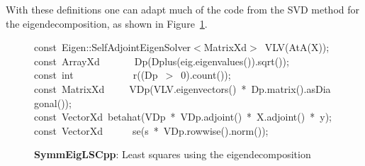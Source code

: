 \documentclass[shortnames,article]{jss}
\newcommand{\hlstd}[1]{\textcolor[rgb]{0,0,0}{#1}}
\newcommand{\hlnum}[1]{\textcolor[rgb]{0,0,0}{#1}}
\newcommand{\hlopt}[1]{\textcolor[rgb]{0,0,0}{#1}}
\newcommand{\hlkwb}[1]{\textcolor[rgb]{0.13,0.54,0.13}{#1}}
\newcommand{\hlkwd}[1]{\textcolor[rgb]{0,0,0}{#1}}
\begin{document}
With these definitions one can adapt much of the code from the SVD
method for the eigendecomposition, as shown in Figure~\ref{SymmEigLS}.
\begin{figure}[htb]
    \noindent
    \ttfamily
    \hlkwb{const\ }\hlstd{Eigen}\hlopt{::}\hlstd{SelfAdjointEigenSolver}\hlopt{$<$}\hlstd{MatrixXd}\hlopt{$>$\ }\hlstd{}\hlkwd{VLV}\hlstd{}\hlopt{(}\hlstd{}\hlkwd{AtA}\hlstd{}\hlopt{(}\hlstd{X}\hlopt{));}\hspace*{\fill}\\
    \hlstd{}\hlkwb{const\ }\hlstd{ArrayXd}\hlstd{\ \ \ \ \ \ \ }\hlstd{}\hlkwd{Dp}\hlstd{}\hlopt{(}\hlstd{}\hlkwd{Dplus}\hlstd{}\hlopt{(}\hlstd{eig}\hlopt{.}\hlstd{}\hlkwd{eigenvalues}\hlstd{}\hlopt{()).}\hlstd{}\hlkwd{sqrt}\hlstd{}\hlopt{());}\hspace*{\fill}\\
    \hlstd{}\hlkwb{const\ int}\hlstd{\ \ \ \ \ \ \ \ \ \ \ \ }\hlkwb{}\hlstd{}\hlkwd{r}\hlstd{}\hlopt{((}\hlstd{Dp\ }\hlopt{$>$\ }\hlstd{}\hlnum{0}\hlstd{}\hlopt{).}\hlstd{}\hlkwd{count}\hlstd{}\hlopt{());}\hspace*{\fill}\\
    \hlstd{}\hlkwb{const\ }\hlstd{MatrixXd}\hlstd{\ \ \ \ \ }\hlstd{}\hlkwd{VDp}\hlstd{}\hlopt{(}\hlstd{VLV}\hlopt{.}\hlstd{}\hlkwd{eigenvectors}\hlstd{}\hlopt{()\ {*}\ }\hlstd{Dp}\hlopt{.}\hlstd{}\hlkwd{matrix}\hlstd{}\hlopt{().}\hlstd{}\hlkwd{asDiagonal}\hlstd{}\hlopt{());}\hspace*{\fill}\\
    \hlstd{}\hlkwb{const\ }\hlstd{VectorXd\ }\hlkwd{betahat}\hlstd{}\hlopt{(}\hlstd{VDp\ }\hlopt{{*}\ }\hlstd{VDp}\hlopt{.}\hlstd{}\hlkwd{adjoint}\hlstd{}\hlopt{()\ {*}\ }\hlstd{X}\hlopt{.}\hlstd{}\hlkwd{adjoint}\hlstd{}\hlopt{()\ {*}\ }\hlstd{y}\hlopt{);}\hspace*{\fill}\\
    \hlstd{}\hlkwb{const\ }\hlstd{VectorXd}\hlstd{\ \ \ \ \ \ }\hlstd{}\hlkwd{se}\hlstd{}\hlopt{(}\hlstd{s\ }\hlopt{{*}\ }\hlstd{VDp}\hlopt{.}\hlstd{}\hlkwd{rowwise}\hlstd{}\hlopt{().}\hlstd{}\hlkwd{norm}\hlstd{}\hlopt{());}\hlstd{}\hspace*{\fill}\\
    \mbox{}
    \normalfont
    \normalsize
  \caption{\textbf{SymmEigLSCpp}: Least squares using the eigendecomposition}
  \label{SymmEigLS}
\end{figure}
\end{document}
